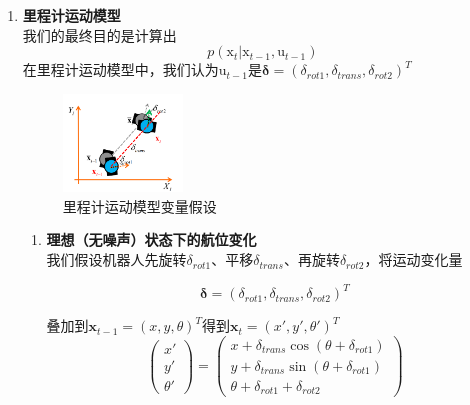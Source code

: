 \documentclass[../main.tex]{subfiles}
\begin{document}
\begin{enumerate}
    \item \textbf{里程计运动模型}\\
    我们的最终目的是计算出$$p(\mathrm{x}_t|\mathrm{x}_{t-1},\mathrm{u}_{t-1})$$
    在里程计运动模型中，我们认为$\mathrm{u}_{t-1}$是$\boldsymbol{\delta} = (\delta_{rot1}, \delta_{trans}, \delta_{rot2})^T$
                \begin{figure}[H]
                \centering
                \includegraphics[width=0.3\textwidth]{images/licheng_model1.png}
                \caption{里程计运动模型变量假设}
            \end{figure}
    \begin{enumerate}
        \item \textbf{理想（无噪声）状态下的航位变化}\\
        我们假设机器人先旋转$\delta_{rot1}$、平移$\delta_{trans}$、再旋转$\delta_{rot2}$，将运动变化量        
        
        $$\boldsymbol{\delta} = (\delta_{rot1}, \delta_{trans}, \delta_{rot2})^T$$
        
        叠加到$\mathbf{x}_{t-1}=(x,y,\theta)^T\text{得到}\mathbf{x}_t=(x',y',\theta')^T$
        $$\begin{pmatrix}x'\\y'\\\theta'\end{pmatrix}=\begin{pmatrix}x+\delta_{trans}\cos(\theta+\delta_{rot1})\\y+\delta_{trans}\sin(\theta+\delta_{rot1})\\\theta+\delta_{rot1}+\delta_{rot2}\end{pmatrix}$$


\end{enumerate}
\end{enumerate}
\end{document}
